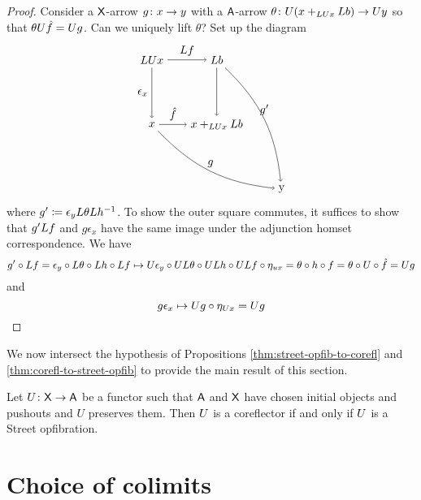 \documentclass{amsart}
\begin{document}
\begin{proof}
  Consider a $ \mathsf{X} $-arrow $ g \colon x \to y $
  with a $ \mathsf{A} $-arrow
  $ \theta \colon U( x +_{LU x} L b ) \to U y $ so
  that $ \theta U \hat{f} = U g $.  Can we
  uniquely lift $ \theta $? Set up the diagram
  \[
    \begin{tikzpicture}
      \node (ul) at (0,2) {$ \L\U x $};
      \node (ll) at (0,0) {$ x $};
      \node (ur) at (2,2) {$ \L b $};
      \node (lr) at (2,0) {$ x +_{\L\U x} \L b$};
      \node (comp) at (4,-2) {y};
      \draw [->] (ul) to node [left] {$ \epsilon_x $} (ll);
      \draw [->] (ul) to node [above] {$ \L f $} (ur);
      \draw [->] (ll) to node [above] {$ \hat{f} $} (lr);
      \draw [->] (ur) to (lr);
      \draw [->] (ll) to [bend right=20] node [above] {$ g $} (comp);
      \draw [->] (ur) to [bend left=20] node [above] {$ g' $} (comp);
    \end{tikzpicture}
  \] 
  where $ g' \coloneqq \epsilon_y L\theta L h^{-1} $.
  To show the outer square commutes, it suffices
  to show that $ g' L f $ and $ g \epsilon_x $
  have the same image under the adjunction homset
  correspondence.  We have
  \[
    g' \circ L f =
    \epsilon_y \circ L\theta \circ L h \circ L f
    \mapsto
    U\epsilon_y \circ UL\theta \circ UL h
      \circ UL f \circ\eta_{ux}
    = \theta \circ h \circ f   
    = \theta \circ U \circ \hat{f} 
    = U g
  \]
  and 
  \[
    g \epsilon_x
    \mapsto
    U g \circ \eta_{U x}
    = U g
  \]
\end{proof}

We now intersect the hypothesis of Propositions
\cref{thm:street-opfib-to-corefl} and
\cref{thm:corefl-to-street-opfib} to provide the
main result of this section.

\begin{thm}
  \label{thm:main-theorem-street-version}
  Let $ U \colon \mathsf{X} \to \mathsf{A} $ be a functor such that $ \mathsf{A} $
  and $ \mathsf{X} $ have chosen initial objects and pushouts and
  $ U $ preserves them. Then $ U $ is a coreflector if and
  only if $ U $ is a Street opfibration.
\end{thm}





\appendix{}

\section{Choice of colimits}
\label{sec:choice_of_colimits}
\end{document}
